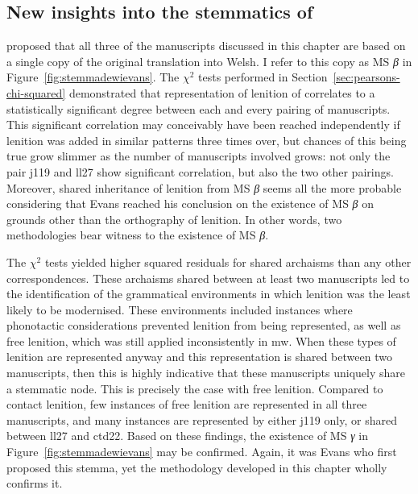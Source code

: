 \subsection{New insights into the stemmatics of }
\label{sec:new-insights-into}

\Textcite[lviii]{Eva_Welsh88} proposed that all three of the manuscripts discussed in this chapter are based on a single copy of the original translation into Welsh. I refer to this copy as MS \textit{β} in Figure~\ref{fig:stemmadewievans}. The \(\chi^2\) tests performed in Section~\ref{sec:pearsons-chi-squared} demonstrated that representation of lenition of  correlates to a statistically significant degree between each and every pairing of manuscripts. This significant correlation may conceivably have been reached independently if lenition was added in similar patterns three times over, but chances of this being true grow slimmer as the number of manuscripts involved grows: not only the pair \gls{j119} and \gls{ll27} show significant correlation, but also the two other pairings. Moreover, shared inheritance of lenition from MS \textit{β} seems all the more probable considering that Evans reached his conclusion on the existence of MS \textit{β} on grounds other than the orthography of lenition. In other words,  two methodologies  bear witness to the existence of MS \textit{β}. 

The \(\chi^2\) tests yielded higher squared residuals for shared archaisms than any other correspondences. These archaisms shared between at least two manuscripts led to the identification of the grammatical environments in which lenition was the least likely to be modernised. These environments included instances where phonotactic considerations prevented lenition from being represented, as well as free lenition, which was still applied inconsistently in \gls{mw}. When these types of lenition are represented anyway and this representation is shared between two manuscripts, then this is highly indicative that these manuscripts uniquely share a stemmatic node. This is precisely the case with free lenition. Compared to contact lenition, few instances of free lenition are represented in all three manuscripts, and many instances are represented by either \gls{j119} only, or shared between \gls{ll27} and \gls{ctd22}. Based on these findings, the existence of MS \textit{γ} in Figure~\ref{fig:stemmadewievans} may be confirmed. Again, it was Evans who first proposed this stemma, yet the methodology developed in this chapter wholly confirms it.

